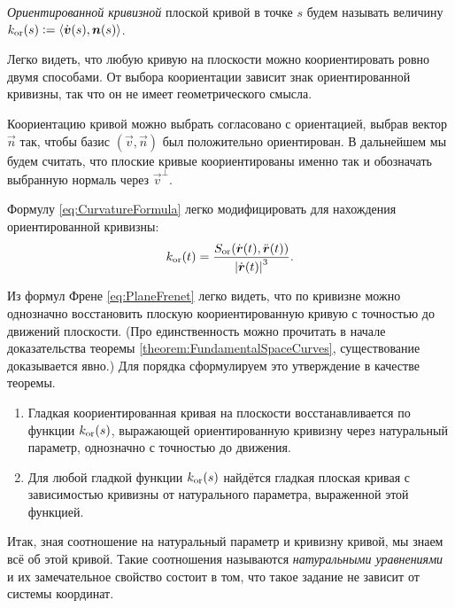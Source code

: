 \begin{definition}
	\textit{Ориентированной кривизной} плоской кривой в точке $s$ будем называть величину $k_{\mathrm{or}}(s) \vcentcolon = \langle\dot{\boldsymbol{v}}(s), \boldsymbol{n}(s)\rangle$.
\end{definition}

Легко видеть, что любую кривую на плоскости можно коориентировать ровно двумя способами. От выбора коориентации зависит знак ориентированной кривизны, так что он не имеет геометрического смысла.

Коориентацию кривой можно выбрать согласовано с ориентацией, выбрав вектор $\vec{n}$ так, чтобы базис $(\vec{v}, \vec{n})$ был положительно ориентирован. В дальнейшем мы будем считать, что плоские кривые коориентированы именно так и обозначать выбранную нормаль через $\vec{v}^{\perp}$.

Формулу \eqref{eq:CurvatureFormula} легко модифицировать для нахождения ориентированной кривизны:
\begin{equation} \label{eq:OrientedCurvature}
	k_{\mathrm{or}}(t) = \frac{S_{\mathrm{or}}(\dot{\boldsymbol{r}}(t), \ddot{\boldsymbol{r}}(t))}{\left\lvert\dot{\boldsymbol{r}}(t)\right\rvert^3}.
\end{equation}

Из формул Френе \eqref{eq:PlaneFrenet} легко видеть, что по кривизне можно однозначно восстановить плоскую коориентированную кривую с точностью до движений плоскости. (Про единственность можно прочитать в начале доказательства теоремы \ref{theorem:FundamentalSpaceCurves}, существование доказывается явно.) Для порядка сформулируем это утверждение в качестве теоремы.

\begin{theorem} \label{theorem:FundamentalPlaneCurves}
	\begin{enumerate}[nolistsep, label=(\arabic*)]
		\item Гладкая коориентированная кривая на плоскости восстанавливается по функции $k_{\mathrm{or}}(s)$, выражающей ориентированную кривизну через натуральный параметр, однозначно с точностью до движения.
		\item Для любой гладкой функции $k_{\mathrm{or}}(s)$ найдётся гладкая плоская кривая с зависимостью кривизны от натурального параметра, выраженной этой функцией.
	\end{enumerate}
\end{theorem}

Итак, зная соотношение на натуральный параметр и кривизну кривой, мы знаем всё об этой кривой. Такие соотношения называются \textit{натуральными уравнениями} и их замечательное свойство состоит в том, что такое задание не зависит от системы координат.

